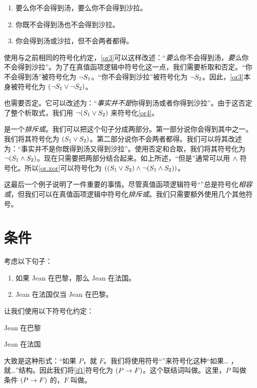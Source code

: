 \begin{enumerate}
		\item\label{or3} 要么你不会得到汤，要么你不会得到沙拉。
		\item\label{or4} 你既不会得到汤也不会得到沙拉。
		\item\label{or.xor} 你会得到汤或沙拉，但不会两者都得。
	\end{enumerate}

使用与之前相同的符号化约定，\cref*{or3}可以这样改述：“\emph{要么}你不会得到汤，\emph{要么}你不会得到沙拉”。为了在真值函项逻辑中符号化这一点，我们需要析取和否定。“你不会得到汤”被符号化为 $\neg S_1$。“你不会得到沙拉”被符号化为 $\neg S_2$。因此，\cref*{or3}本身被符号化为 $(\neg S_1 \vee \neg S_2)$。

也需要否定。它可以改述为：“\emph{事实并不是}你得到汤或者你得到沙拉”。由于这否定了整个析取式，我们用 $\neg (S_1 \vee S_2)$ 来符号化\cref*{or4}。

是一个\emph{排斥或}。我们可以把这个句子分成两部分。第一部分说你会得到其中之一。我们将其符号化为 $(S_1 \vee S_2)$。第二部分说你不会两者都得。我们可以将其改述为：“事实并不是你既得到汤又得到沙拉”。使用否定和合取，我们将其符号化为 $\neg(S_1 \wedge S_2)$。现在只需要把两部分结合起来。如上所述，“但是”通常可以用 $\wedge$ 符号化。所以\cref*{or.xor}可以符号化为 $((S_1 \vee S_2) \wedge \neg(S_1 \wedge S_2))$。

这最后一个例子说明了一件重要的事情。尽管真值函项逻辑符号“\eor”总是符号化\emph{相容或}，但我们可以在{真值函项逻辑}中符号化\emph{排斥或}。我们只需要额外使用几个其他符号。

\section{条件}
考虑以下句子：

\begin{enumerate}
		\item\label{if1} 如果 Jean 在巴黎，那么 Jean 在法国。
		\item\label{if2} Jean 在法国仅当 Jean 在巴黎。
	\end{enumerate}

让我们使用以下符号化约定：

\begin{ekey}
		\item[P] Jean 在巴黎
		\item[F] Jean 在法国
	\end{ekey}

大致是这种形式：“如果 $P$，就 $F$。我们将使用符号“\eif”来符号化这种“如果… ，就…”结构。因此我们将\cref*{if1}符号化为 $(P\rightarrow F)$。这个联结词叫做。这里，$P$ 叫做条件 $(P \rightarrow F)$ 的，$F$ 叫做。

